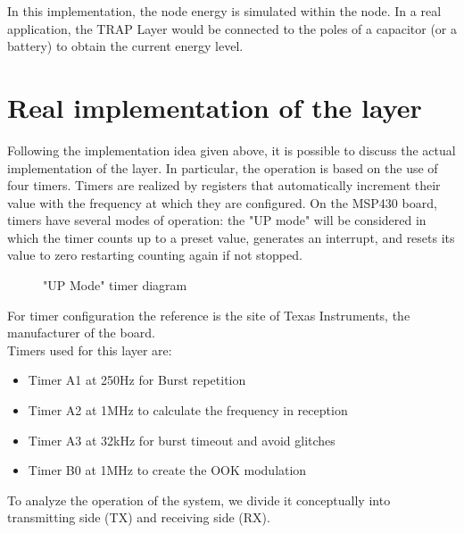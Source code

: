 In this implementation, the node energy is simulated within the node. In a real application, the TRAP Layer would be connected to the poles of a capacitor (or a battery) to obtain the current energy level.

\section{Real implementation of the layer}
\label{sec:Real implementation of the layer}
Following the implementation idea given above, it is possible to discuss the actual implementation of the layer.
In particular, the operation is based on the use of four timers. Timers are realized by registers that automatically increment their value with the frequency at which they are configured. On the MSP430 board, timers have several modes of operation: the "UP mode" will be considered in which the timer counts up to a preset value, generates an interrupt, and resets its value to zero restarting counting again if not stopped.\\
  \begin{figure}[h!]
    \centerline{}
    \caption{\footnotesize \centering "UP Mode" timer diagram}
    \label{fig:TimerMode}
  \end{figure}
For timer configuration the reference is the site of Texas Instruments, the manufacturer of the board.\\
Timers used for this layer are:
\begin{itemize}
  \item Timer A1 at 250Hz for Burst repetition
  \item Timer A2 at 1MHz to calculate the frequency in reception
  \item Timer A3 at 32kHz for burst timeout and avoid glitches
  \item Timer B0 at 1MHz to create the OOK modulation
\end{itemize}
To analyze the operation of the system, we divide it conceptually into transmitting side (TX) and receiving side (RX).

